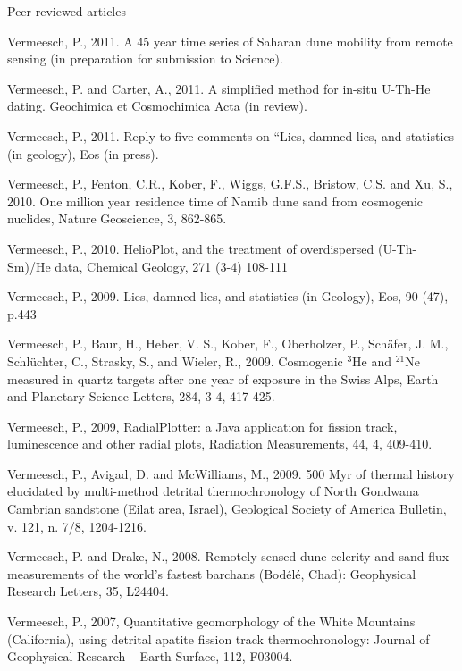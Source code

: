 \documentclass{resume}
\begin{document}
\begin{category}{Peer reviewed articles}

\citemnobullet Vermeesch, P., 2011. A 45 year time series of Saharan dune mobility from
remote sensing (in preparation for submission to Science).

\citemnobullet Vermeesch, P. and Carter, A., 2011. A simplified method for in-situ U-Th-He dating.
Geochimica et Cosmochimica Acta (in review).

\citemnobullet Vermeesch, P., 2011. Reply to five comments on ``Lies, damned lies,
and statistics (in geology), Eos (in press).

\citemnobullet Vermeesch, P., Fenton, C.R., Kober, F., Wiggs, G.F.S.,
    Bristow, C.S. and Xu, S., 2010. One million year residence time of Namib
    dune sand from cosmogenic nuclides, Nature Geoscience, 3, 862-865.

\citemnobullet Vermeesch, P., 2010. HelioPlot, and the treatment of
overdispersed (U-Th-Sm)/He data, Chemical Geology, 271 (3-4) 108-111

\citemnobullet Vermeesch, P., 2009. Lies, damned lies, and statistics
(in Geology), Eos, 90 (47), p.443

\citemnobullet Vermeesch, P., Baur, H., Heber, V. S., Kober, F.,
  Oberholzer, P., Sch\"{a}fer, J. M., Schl\"{u}chter, C., Strasky, S.,
  and Wieler, R., 2009. Cosmogenic $^3$He and $^{21}$Ne measured in
  quartz targets after one year of exposure in the Swiss Alps, Earth
  and Planetary Science Letters, 284, 3-4, 417-425.

\citemnobullet Vermeesch, P., 2009, RadialPlotter: a Java application
  for fission track, luminescence and other radial plots, Radiation
  Measurements, 44, 4, 409-410.

\citemnobullet Vermeesch, P., Avigad, D. and McWilliams, M., 2009. 500
Myr of thermal history elucidated by multi-method detrital
thermochronology of North Gondwana Cambrian sandstone (Eilat area,
Israel), Geological Society of America Bulletin, v. 121, n. 7/8,
1204-1216.

\citemnobullet Vermeesch, P. and Drake, N., 2008. Remotely sensed dune
celerity and sand flux measurements of the world's fastest barchans
(Bod\'{e}l\'{e}, Chad): Geophysical Research Letters, 35, L24404.

\citemnobullet Vermeesch, P., 2007, Quantitative geomorphology of the
White Mountains (California), using detrital apatite fission track
thermochronology: Journal of Geophysical Research -- Earth Surface,
112, F03004.


\end{category}
\end{document}
